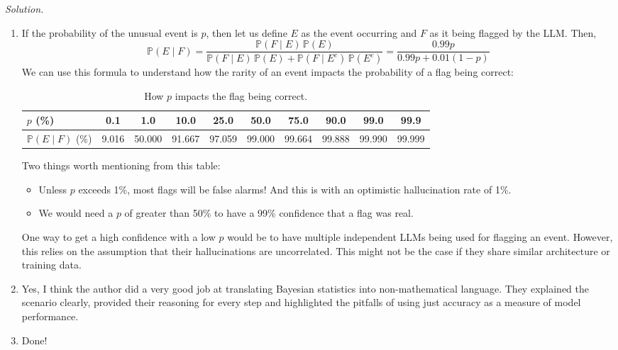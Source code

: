 \documentclass[11pt]{article}
\newenvironment{solution}{%
  \noindent\textit{Solution.}\quad
}{\par\bigskip}
\begin{document}
\begin{solution}
\begin{enumerate}
      \item If the probability of the unusual event is $p$, then let us define $E$ 
            as the event occurring and $F$ as it being flagged by the LLM. Then,
            \[
            \mathbb{P}(E \mid F) = \frac{\mathbb{P}(F \mid E) \, \mathbb{P}(E)}
            {\mathbb{P}(F \mid E) \, \mathbb{P}(E) + \mathbb{P}(F \mid E^{c}) \, \mathbb{P}(E^{c})}
            = \frac{0.99 p}{0.99p + 0.01(1-p)}
            \]
            We can use this formula to understand how the rarity of an event impacts 
            the probability of a flag being correct:
            \begin{table}[H]
            \centering
            \begin{tabular}{lccccccccc}
            \toprule
            $p$ (\%) & 0.1 & 1.0 & 10.0 & 25.0 & 50.0 & 75.0 & 90.0 & 99.0 & 99.9 \\
            \midrule
            $\mathbb{P}(E \mid F)$ (\%) & 9.016 & 50.000 & 91.667 & 97.059 & 99.000 & 99.664 & 99.888 & 99.990 & 99.999 \\
            \bottomrule
            \end{tabular}
            \caption{How $p$ impacts the flag being correct.}
            \end{table}
            Two things worth mentioning from this table:
            \begin{itemize}
                  \item Unless $p$ exceeds 1\%, most flags will be 
                        false alarms! And this is with an optimistic hallucination 
                        rate of 1\%.
                  \item We would need a $p$ of greater than 50\% to have a 99\%
                        confidence that a flag was real. 
            \end{itemize}
            One way to get a high confidence with a low $p$ would be to have 
            multiple independent LLMs being used for flagging an event. However, 
            this relies on the assumption that their hallucinations are uncorrelated. 
            This might not be the case if they share similar architecture or 
            training data.
      \item Yes, I think the author did a very good job at translating Bayesian 
            statistics into non-mathematical language. They explained the scenario 
            clearly, provided their reasoning for every step and highlighted the 
            pitfalls of using just accuracy as a measure of model performance. 
      \item Done!
\end{enumerate}
\end{solution}
\end{document}
